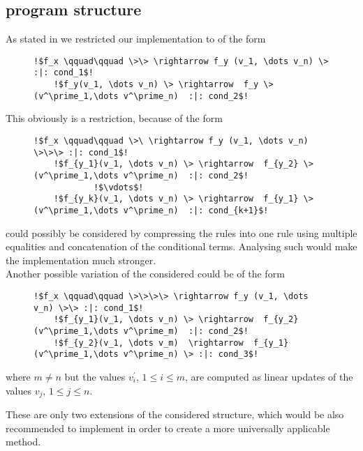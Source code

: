 \subsection{\its program structure}
\label{sec:structure-improvement}
As stated in  we restricted our implementation to \itss of the form 
\begin{figure}[H]
	\begin{lstlisting}[escapechar=!]
	!$f_x \qquad\qquad \>\> \rightarrow f_y (v_1, \dots v_n) \> :|: cond_1$!
	!$f_y(v_1, \dots v_n) \> \rightarrow  f_y \>(v^\prime_1,\dots v^\prime_n)  :|: cond_2$!
	\end{lstlisting}
\end{figure}
This obviously is a restriction, because \itss of the form
\begin{figure}[H]
	\begin{lstlisting}[escapechar=!]
	!$f_x \qquad\qquad \>\ \rightarrow f_y (v_1, \dots v_n) \>\>\> :|: cond_1$!
	!$f_{y_1}(v_1, \dots v_n) \> \rightarrow  f_{y_2} \>(v^\prime_1,\dots v^\prime_n)  :|: cond_2$!
			!$\vdots$!
	!$f_{y_k}(v_1, \dots v_n) \> \rightarrow  f_{y_1} \>(v^\prime_1,\dots v^\prime_n)  :|: cond_{k+1}$!
	\end{lstlisting}
\end{figure}
could possibly be considered by compressing the rules into one rule using multiple equalities and concatenation of the conditional terms. Analysing such \itss would make the implementation much stronger.
\\
Another possible variation of the considered \itss could be of the form
\begin{figure}[H]
	\begin{lstlisting}[escapechar=!]
	!$f_x \qquad\qquad \>\>\>\> \rightarrow f_y (v_1, \dots v_n) \>\> :|: cond_1$!
	!$f_{y_1}(v_1, \dots v_n) \> \rightarrow  f_{y_2} (v^\prime_1,\dots v^\prime_m)  :|: cond_2$!
	!$f_{y_2}(v_1, \dots v_m)  \rightarrow  f_{y_1} (v^\prime_1,\dots v^\prime_n) \> :|: cond_3$!
	\end{lstlisting}
\end{figure}
where $m \ne n$ but the values $v^\prime_i$, $1 \le i \le m$, are computed as linear updates of the values $v_j$, $1 \le j \le n$.

These are only two extensions of the considered structure, which would be also recommended to implement in order to create a more universally applicable method.

